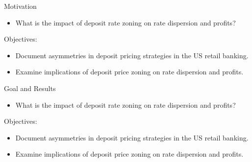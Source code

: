 \documentclass[notes,11pt, aspectratio=169]{beamer}
\begin{document}


    

    
  
\begin{frame}{Motivation}

\begin{itemize}
    \item  What is the impact of deposit rate zoning on rate dispersion and profits?
\end{itemize}
\vspace{1cm}
Objectives:
\begin{itemize}
  \item Document asymmetries in deposit pricing strategies in the US retail banking. 
  \item Examine implications of deposit price zoning on rate dispersion and profits.
\end{itemize}

\end{frame}

\begin{frame}{Goal and Results}

    \begin{itemize}
        \item  What is the impact of deposit rate zoning on rate dispersion and profits?
    \end{itemize}
    \vspace{1cm}
    Objectives:
    \begin{itemize}
      \item Document asymmetries in deposit pricing strategies in the US retail banking. 
      \item Examine implications of deposit price zoning on rate dispersion and profits.
    \end{itemize}
    
    \end{frame}
\end{document}
